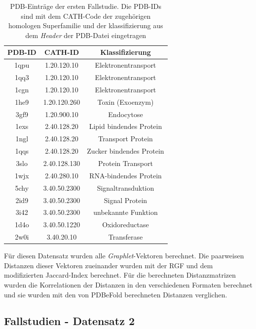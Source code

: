 \documentclass{report}
\begin{document}
\begin{table}[h!]
\label{tab:set1}
\begin{tabular}{ | c || c | c |}

\hline
PDB-ID & CATH-ID        & Klassifizierung      \\ \hline
1qpu   & 1.20.120.10 & Elektronentransport     \\ \hline
1qq3   & 1.20.120.10 & Elektronentransport     \\ \hline
1cgn   & 1.20.120.10 & Elektronentransport     \\ \hline
1he9   & 1.20.120.260& Toxin (Exoenzym)        \\ \hline
3gf9   & 1.20.900.10 & Endocytose              \\ \hline
1exs   & 2.40.128.20 & Lipid bindendes Protein \\ \hline
1ngl   & 2.40.128.20 & Transport Protein       \\ \hline
1qqs   & 2.40.128.20 & Zucker bindendes Protein\\ \hline
3slo   & 2.40.128.130& Protein Transport       \\ \hline
1wjx   & 2.40.280.10 & RNA-bindendes Protein   \\ \hline
5chy   & 3.40.50.2300& Signaltransduktion      \\ \hline
2id9   & 3.40.50.2300& Signal Protein          \\ \hline
3i42   & 3.40.50.2300& unbekannte Funktion     \\ \hline
1d4o   & 3.40.50.1220& Oxidoreductase          \\ \hline
2w0i   & 3.40.20.10  & Transferase             \\ 
\hline
\end{tabular}
\caption{PDB-Eintr\"age der ersten Fallstudie. Die PDB-IDs sind mit dem CATH-Code der zugeh\"origen homologen Superfamilie und der klassifizierung aus dem \textit{Header} der PDB-Datei eingetragen}
\end{table}

F\"ur diesen Datensatz wurden alle \textit{Graphlet}-Vektoren berechnet. Die paarweisen Distanzen dieser Vektoren zueinander wurden mit der RGF und dem modifizierten Jaccard-Index berechnet. F\"ur die berechneten Distanzmatrizen wurden die Korrelationen der Distanzen in den verschiedenen Formaten berechnet und sie wurden mit den von PDBeFold berechneten Distanzen verglichen. 


\subsection{Fallstudien - Datensatz 2}
\end{document}
